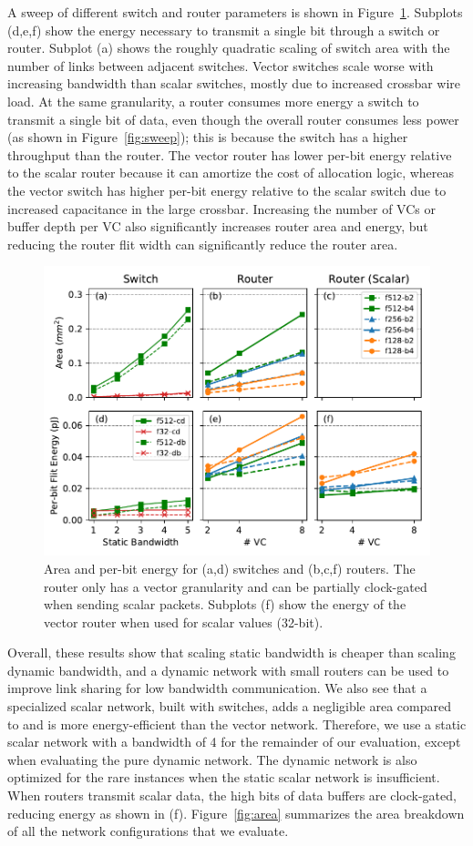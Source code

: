 A sweep of different switch and router parameters is shown in Figure~\ref{fig:char}. Subplots (d,e,f) show the energy necessary to transmit a single bit through a switch or router.
Subplot (a) shows the roughly quadratic scaling of switch area with the number of links between adjacent switches.
Vector switches scale worse with increasing bandwidth than scalar switches, mostly due to increased crossbar wire load. 
At the same granularity, a router consumes more energy a switch to transmit a single bit of data, even though the overall router consumes less power (as shown in Figure~\ref{fig:sweep}); 
this is because the switch has a higher throughput than the router.
The vector router has lower per-bit energy relative to the scalar router because it can amortize the cost of allocation logic, whereas the vector switch has higher per-bit energy relative to the scalar switch due to increased capacitance in the large crossbar. 
Increasing the number of VCs or buffer depth per VC also significantly increases router area and energy, but reducing the router flit width can significantly reduce the router area. 

\begin{figure}
\centering
\includegraphics[width=0.8\columnwidth]{network/figs/char.pdf}
  \caption{Area and per-bit energy for (a,d) switches and (b,c,f) routers. 
  The router only has a vector granularity and can be partially clock-gated when sending scalar packets.
  Subplots (f) show the energy of the vector router when used for scalar values (32-bit).}\label{fig:char}
\end{figure}

Overall, these results show that scaling static bandwidth is cheaper than scaling dynamic bandwidth, and a dynamic network with small routers can be used to improve link sharing for low bandwidth communication.  
We also see that a specialized scalar network, built with switches, adds a negligible area compared to and is more energy-efficient than the vector network. 
Therefore, we use a static scalar network with a bandwidth of 4 for the remainder of our evaluation, except when evaluating the pure dynamic network.
The dynamic network is also optimized for the rare instances when the static scalar network is insufficient. 
When routers transmit scalar data, the high bits of data buffers are clock-gated, reducing energy as shown in (f).
Figure~\ref{fig:area} summarizes the area breakdown of all the network configurations that we evaluate.

